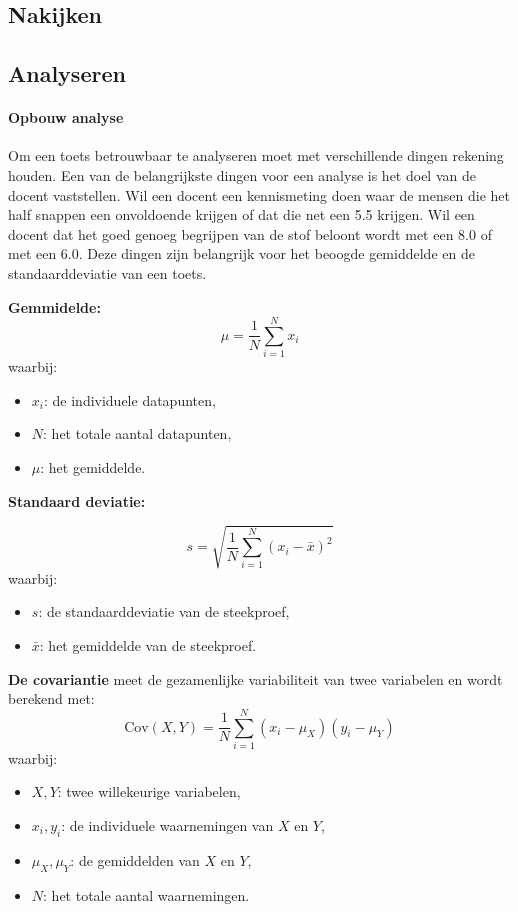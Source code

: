 \documentclass[12pt]{article}
\begin{document}
\pagebreak
\subsection{Nakijken}
\pagebreak
\subsection{Analyseren}
\begin{multicols}{2}
\paragraph*{Opbouw analyse} Om een toets betrouwbaar te analyseren moet met verschillende dingen rekening houden. Een van de belangrijkste dingen voor een analyse is het doel van de docent vaststellen. Wil een docent een kennismeting doen waar de mensen die het half snappen een onvoldoende krijgen of dat die net een 5.5 krijgen. Wil een docent dat het goed genoeg begrijpen van de stof beloont wordt met een 8.0 of met een 6.0. Deze dingen zijn belangrijk voor het beoogde gemiddelde en de standaarddeviatie van een toets.
\begin{minipage}{1\linewidth}
    
\textbf{Gemmidelde: }
\[
\mu = \frac{1}{N} \sum_{i=1}^N x_i
\]
waarbij:
\begin{itemize}
    \item \( x_i \): de individuele datapunten,
    \item \( N \): het totale aantal datapunten,
    \item \( \mu \): het gemiddelde.
\end{itemize}
\end{minipage}
\begin{minipage}{\linewidth}
\textbf{Standaard deviatie: }

\[
s = \sqrt{\frac{1}{N} \sum_{i=1}^N (x_i - \bar{x})^2}
\]
waarbij:
\begin{itemize}
    \item \( s \): de standaarddeviatie van de steekproef,
    \item \( \bar{x} \): het gemiddelde van de steekproef.
\end{itemize}
\end{minipage}
\begin{minipage}{\linewidth}
\textbf{De covariantie} meet de gezamenlijke variabiliteit van twee variabelen en wordt berekend met:
\[
\text{Cov}(X, Y) = \frac{1}{N} \sum_{i=1}^N (x_i - \mu_X)(y_i - \mu_Y)
\]
waarbij:
\begin{itemize}
    \item \(X, Y\): twee willekeurige variabelen,
    \item \(x_i, y_i\): de individuele waarnemingen van \(X\) en \(Y\),
    \item \(\mu_X, \mu_Y\): de gemiddelden van \(X\) en \(Y\),
    \item \(N\): het totale aantal waarnemingen.
\end{itemize}
\end{minipage}
\end{multicols}
\end{document}
